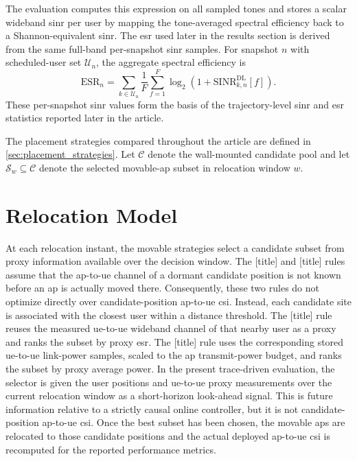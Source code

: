 The evaluation computes this expression on all sampled tones and stores a scalar wideband \gls{sinr} per user by mapping the tone-averaged spectral efficiency back to a Shannon-equivalent \gls{sinr}. The \gls{esr} used later in the results section is derived from the same full-band per-snapshot \gls{sinr} samples. For snapshot $n$ with scheduled-user set $\mathcal{U}_n$, the aggregate spectral efficiency is
\begin{equation}
    \mathrm{ESR}_n = \sum_{k \in \mathcal{U}_n}\frac{1}{F}\sum_{f=1}^{F}\log_2\!\left(1+\mathrm{SINR}^{\mathrm{DL}}_{k,n}[f]\right).
\end{equation}
These per-snapshot \gls{sinr} values form the basis of the trajectory-level \gls{sinr} and \gls{esr} statistics reported later in the article.

The placement strategies compared throughout the article are defined in \cref{sec:placement_strategies}. Let $\mathcal{C}$ denote the wall-mounted candidate pool and let $\mathcal{S}_w \subseteq \mathcal{C}$ denote the selected movable-\gls{ap} subset in relocation window $w$.


\section{Relocation Model}

At each relocation instant, the movable strategies select a candidate subset from proxy information available over the decision window. The [title] and [title] rules assume that the \gls{ap}-to-\gls{ue} channel of a dormant candidate position is not known before an \gls{ap} is actually moved there. Consequently, these two rules do not optimize directly over candidate-position \gls{ap}-to-\gls{ue} \gls{csi}. Instead, each candidate site is associated with the closest user within a distance threshold. The [title] rule reuses the measured \gls{ue}-to-\gls{ue} wideband channel of that nearby user as a proxy and ranks the subset by proxy \gls{esr}. The [title] rule uses the corresponding stored \gls{ue}-to-\gls{ue} link-power samples, scaled to the \gls{ap} transmit-power budget, and ranks the subset by proxy average power. In the present trace-driven evaluation, the selector is given the user positions and \gls{ue}-to-\gls{ue} proxy measurements over the current relocation window as a short-horizon look-ahead signal. This is future information relative to a strictly causal online controller, but it is not candidate-position \gls{ap}-to-\gls{ue} \gls{csi}. Once the best subset has been chosen, the movable \glspl{ap} are relocated to those candidate positions and the actual deployed \gls{ap}-to-\gls{ue} \gls{csi} is recomputed for the reported performance metrics.

